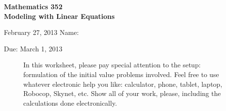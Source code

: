 \documentclass[11pt]{exam}
\begin{document}
\noindent
\textbf{{\large Mathematics 352 \\ Modeling with Linear Equations}}

\noindent
February 27, 2013 \hfill Name: \underline{\hspace{3in}} 

\noindent
Due: March 1, 2013

\noindent
\begin{figure}[h]
\centering
\begin{minipage}[b]{0.6\linewidth}
In this worksheet, please pay special attention to the setup: formulation of the initial value problems involved. Feel free to use whatever electronic help you like: calculator, phone, tablet, laptop, Robocop, Skynet, etc. Show all of your work, please, including the calculations done electronically.
\end{minipage}
\end{figure}
\end{document}
